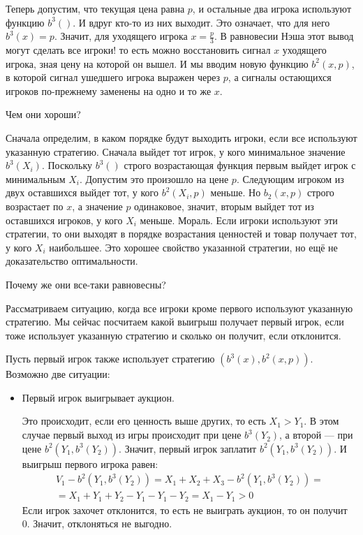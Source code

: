 \begin{myex}
Теперь допустим, что текущая цена равна $ p $, и остальные два игрока используют функцию $ b^{3}() $. И вдруг кто-то из них выходит. Это означает, что для него $ b^{3}(x)=p $. Значит, для уходящего игрока $ x=\frac{p}{3} $. В равновесии Нэша этот вывод могут сделать все игроки! то есть можно восстановить сигнал $ x $ уходящего игрока, зная цену на которой он вышел. И мы вводим новую функцию $ b^{2}(x,p) $, в которой сигнал ушедшего игрока выражен через $ p $, а сигналы остающихся игроков по-прежнему заменены на одно и то же $ x $.

Чем они хороши?

Сначала определим, в каком порядке будут выходить игроки, если все используют указанную стратегию. Сначала выйдет тот игрок, у кого минимальное значение $ b^{3}(X_{i}) $. Поскольку $ b^{3}() $ строго возрастающая функция первым выйдет игрок с минимальным $ X_{i} $. Допустим это произошло на цене $ p $. Следующим игроком из двух оставшихся выйдет тот, у кого $ b^{2}(X_{i},p) $ меньше. Но $ b_{2}(x,p) $ строго возрастает по $ x $, а значение $ p $ одинаковое, значит, вторым выйдет тот из оставшихся игроков, у кого $ X_{i} $ меньше. Мораль. Если игроки используют эти стратегии, то они выходят в порядке возрастания ценностей и товар получает тот, у кого $ X_{i} $ наибольшее. Это хорошее свойство указанной стратегии, но ещё не доказательство оптимальности.

Почему же они все-таки равновесны?

Рассматриваем ситуацию, когда все игроки кроме первого используют указанную стратегию. Мы сейчас посчитаем какой выигрыш получает первый игрок, если тоже использует указанную стратегию и сколько он получит, если отклонится.

Пусть первый игрок также использует стратегию $ (b^{3}(x), b^{2}(x,p)) $. Возможно две ситуации:
\begin{itemize}
\item Первый игрок выигрывает аукцион.

Это происходит, если его ценность выше других, то есть $ X_{1}>Y_{1} $. В этом случае первый выход из игры происходит при цене $ b^{3}(Y_{2}) $, а второй — при цене $ b^{2}(Y_{1},b^{3}(Y_{2})) $. Значит, первый игрок заплатит $ b^{2}(Y_{1},b^{3}(Y_{2})) $. И выигрыш первого игрока равен:
\begin{multline}
V_{1}-b^{2}(Y_{1},b^{3}(Y_{2}))=X_{1}+X_{2}+X_{3}-b^{2}(Y_{1},b^{3}(Y_{2}))=\\
=X_{1}+Y_{1}+Y_{2}-Y_{1}-Y_{1}-Y_{2}=X_{1}-Y_{1}>0
\end{multline}
Если игрок захочет отклонится, то есть не выиграть аукцион, то он получит 0. Значит, отклоняться не выгодно.


\end{itemize}
\end{myex}
